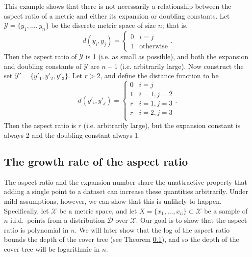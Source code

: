 \documentclass[../main.tex]{subfiles}
\newcommand{\set}[1]{\mathcal {#1}}
\newcommand{\distribution}[1]{\mathcal {#1}}
\newcommand{\dist}[2]{\distf({#1},{#2})}
\newcommand{\distf}{d}
\begin{document}
\begin{example}
    This example shows that there is not necessarily a relationship between the aspect ratio of a metric and either its expansion or doubling constants.
    Let $\set Y=\{y_1,...,y_n\}$ be the discrete metric space of size $n$;
    that is,
    \begin{equation}
        \dist{y_i}{y_j}=
        \begin{cases}
            0 & i = j \\
            1 & \text{otherwise}
        \end{cases}
        .
    \end{equation}
    Then the aspect ratio of $\set Y$ is 1 (i.e. as small as possible),
    and both the expansion and doubling constants of $\set Y$ are $n-1$ (i.e. arbitrarily large).
    Now construct the set $\set Y'=\{y'_1, y'_2, y'_3\}$.
    Let $r>2$, and define the distance function to be
    \begin{equation}
        d(y'_i,y'_j) =
        \begin{cases}
            0 & i=j \\
            1 & i=1, j=2 \\
            r & i=1, j=3 \\
            r & i=2, j=3 \\
        \end{cases}
        .
    \end{equation}
    Then the aspect ratio is $r$ (i.e. arbitrarily large),
    but the expansion constant is always 2
    and the doubling constant always 1.
\end{example}


\subsection{The growth rate of the aspect ratio}

The aspect ratio and the expansion number share the unattractive property that adding a single point to a dataset can increase these quantities arbitrarily.
Under mild assumptions, however, we can show that this is unlikely to happen.
Specifically, let $\set X$ be a metric space, 
and let $X=\{x_1,...,x_n\}\subset\set X$ be a sample of $n$ i.i.d.\ points from a distribution $\distribution D$ over $\set X$.
Our goal is to show that the aspect ratio is polynomial in $n$.
We will later show that the log of the aspect ratio bounds the depth of the cover tree (see Theorem \ref{}),
and so the depth of the cover tree will be logarithmic in $n$.
\end{document}
